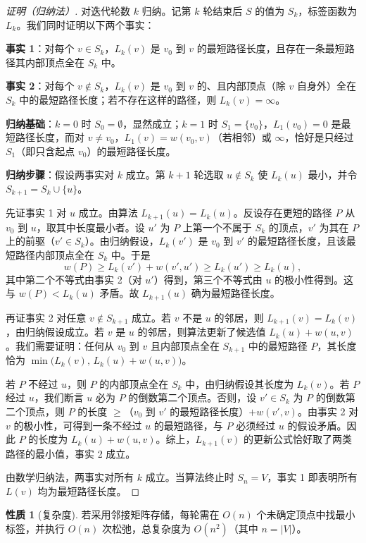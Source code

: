 \documentclass[UTF8,11pt,a4paper]{ctexbook}   %
\theoremstyle{definition}
\newtheorem{property}{性质}[section]
\begin{document}
\begin{proof}[证明（归纳法）]
对迭代轮数 $k$ 归纳。记第 $k$ 轮结束后 $S$ 的值为 $S_k$，标签函数为 $L_k$。我们同时证明以下两个事实：

\textbf{事实 1}：对每个 $v\in S_k$，$L_k(v)$ 是 $v_0$ 到 $v$ 的最短路径长度，且存在一条最短路径其内部顶点全在 $S_k$ 中。

\textbf{事实 2}：对每个 $v\notin S_k$，$L_k(v)$ 是 $v_0$ 到 $v$ 的、且内部顶点（除 $v$ 自身外）全在 $S_k$ 中的最短路径长度；若不存在这样的路径，则 $L_k(v)=\infty$。

\textbf{归纳基础}：$k=0$ 时 $S_0=\emptyset$，显然成立；$k=1$ 时 $S_1=\{v_0\}$，$L_1(v_0)=0$ 是最短路径长度，而对 $v\neq v_0$，$L_1(v)=w(v_0,v)$（若相邻）或 $\infty$，恰好是只经过 $S_1$（即只含起点 $v_0$）的最短路径长度。

\textbf{归纳步骤}：假设两事实对 $k$ 成立。第 $k+1$ 轮选取 $u\notin S_k$ 使 $L_k(u)$ 最小，并令 $S_{k+1}=S_k\cup\{u\}$。

先证事实 1 对 $u$ 成立。由算法 $L_{k+1}(u)=L_k(u)$。反设存在更短的路径 $P$ 从 $v_0$ 到 $u$，取其中长度最小者。设 $u'$ 为 $P$ 上第一个不属于 $S_k$ 的顶点，$v'$ 为其在 $P$ 上的前驱（$v'\in S_k$）。由归纳假设，$L_k(v')$ 是 $v_0$ 到 $v'$ 的最短路径长度，且该最短路径内部顶点全在 $S_k$ 中。于是
\[
w(P) \ge L_k(v') + w(v',u') \ge L_k(u') \ge L_k(u),
\]
其中第二个不等式由事实 2（对 $u'$）得到，第三个不等式由 $u$ 的极小性得到。这与 $w(P)<L_k(u)$ 矛盾。故 $L_{k+1}(u)$ 确为最短路径长度。

再证事实 2 对任意 $v\notin S_{k+1}$ 成立。若 $v$ 不是 $u$ 的邻居，则 $L_{k+1}(v)=L_k(v)$，由归纳假设成立。若 $v$ 是 $u$ 的邻居，则算法更新了候选值 $L_k(u)+w(u,v)$。我们需要证明：任何从 $v_0$ 到 $v$ 且内部顶点全在 $S_{k+1}$ 中的最短路径 $P$，其长度恰为 $\min\bigl(L_k(v),\,L_k(u)+w(u,v)\bigr)$。

若 $P$ 不经过 $u$，则 $P$ 的内部顶点全在 $S_k$ 中，由归纳假设其长度为 $L_k(v)$。若 $P$ 经过 $u$，我们断言 $u$ 必为 $P$ 的倒数第二个顶点。否则，设 $v'\in S_k$ 为 $P$ 的倒数第二个顶点，则 $P$ 的长度 $\ge$（$v_0$ 到 $v'$ 的最短路径长度）$+w(v',v)$。由事实 2 对 $v$ 的极小性，可得到一条不经过 $u$ 的最短路径，与 $P$ 必须经过 $u$ 的假设矛盾。因此 $P$ 的长度为 $L_k(u)+w(u,v)$。综上，$L_{k+1}(v)$ 的更新公式恰好取了两类路径的最小值，事实 2 成立。

由数学归纳法，两事实对所有 $k$ 成立。当算法终止时 $S_n=V$，事实 1 即表明所有 $L(v)$ 均为最短路径长度。
\end{proof}

\begin{property}[复杂度]
若采用邻接矩阵存储，每轮需在 $O(n)$ 个未确定顶点中找最小标签，并执行 $O(n)$ 次松弛，总复杂度为 $O(n^2)$（其中 $n=|V|$）。
\end{property}
\end{document}
